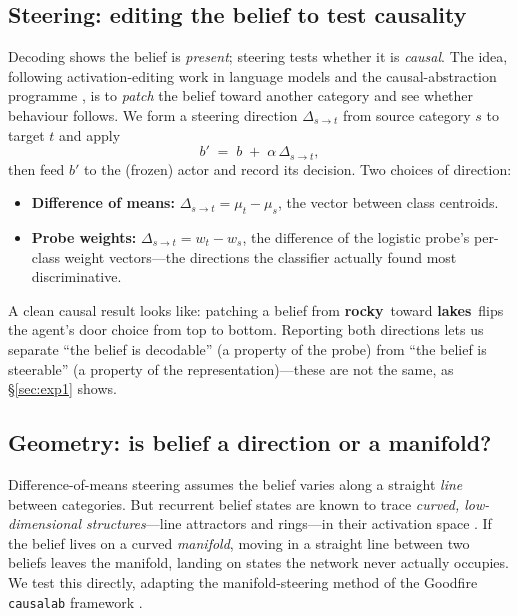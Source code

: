 \documentclass[11pt]{article}
\newcommand{\code}[1]{\texttt{\small #1}}
\newcommand{\lakes}{\textcolor{lakes}{\textbf{lakes}}}
\newcommand{\rocky}{\textcolor{rocky}{\textbf{rocky}}}
\begin{document}
\subsection{Steering: editing the belief to test causality}
\label{sec:steer}
Decoding shows the belief is \emph{present}; steering tests whether it is
\emph{causal}. The idea, following activation-editing work in language models
\cite{turner2023activation,zou2023representation,meng2022locating} and the
causal-abstraction programme \cite{geiger2021causal}, is to \emph{patch} the
belief toward another category and see whether behaviour follows. We form a
steering direction $\Delta_{s\to t}$ from source category $s$ to target $t$ and
apply
\begin{equation}
b' \;=\; b \;+\; \alpha\,\Delta_{s\to t},
\end{equation}
then feed $b'$ to the (frozen) actor and record its decision. Two choices of
direction:
\begin{itemize}[nosep]
\item \textbf{Difference of means:} $\Delta_{s\to t}=\mu_t-\mu_s$, the vector
between class centroids.
\item \textbf{Probe weights:} $\Delta_{s\to t}=w_t-w_s$, the difference of the
logistic probe's per-class weight vectors---the directions the classifier
actually found most discriminative.
\end{itemize}
A clean causal result looks like: patching a belief from \rocky\ toward \lakes\
flips the agent's door choice from top to bottom. Reporting both directions lets
us separate ``the belief is decodable'' (a property of the probe) from ``the
belief is steerable'' (a property of the representation)---these are not the
same, as \S\ref{sec:exp1} shows.

\subsection{Geometry: is belief a direction or a manifold?}
\label{sec:manifold}
Difference-of-means steering assumes the belief varies along a straight
\emph{line} between categories. But recurrent belief states are known to trace
\emph{curved, low-dimensional structures}---line attractors and rings---in their
activation space \cite{sussillo2013opening,shai2024transformers}. If the belief
lives on a curved \emph{manifold}, moving in a straight line between two beliefs
leaves the manifold, landing on states the network never actually occupies. We
test this directly, adapting the manifold-steering method of the Goodfire
\code{causalab} framework \cite{geiger2021causal}.
\end{document}
